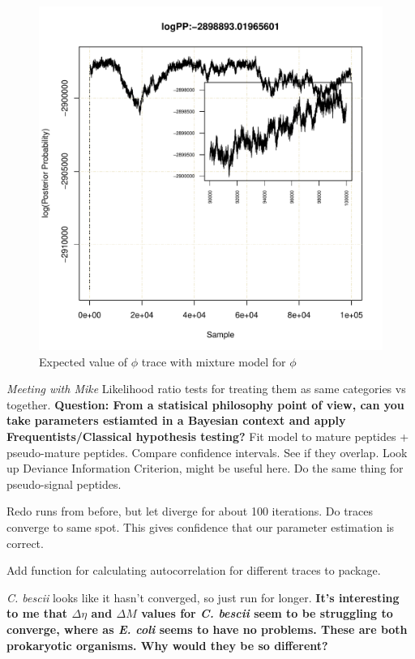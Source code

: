 \documentclass[11pt]{labbook}
\begin{document}
\begin{figure}[H]
\centering
\includegraphics[page=9,scale=0.6]{Mixture_model_testing/Test_mixture/real_data/Graphs/yeast_logPost_mixProb_phi_traces_updated.pdf}
\caption{Expected value of $\phi$ trace with mixture model for $\phi$}
\end{figure}


\textit{Meeting with Mike}
Likelihood ratio tests for treating them as same categories vs together. \textbf{Question: From a statisical philosophy point of view, can you take parameters estiamted in a Bayesian context and apply Frequentists/Classical hypothesis testing?} Fit model to mature peptides + pseudo-mature peptides. Compare confidence intervals. See if they overlap. Look up Deviance Information Criterion, might be useful here. Do the same thing for pseudo-signal peptides. 

Redo runs from before, but let diverge for about 100 iterations. Do traces converge to same spot. This gives confidence that our parameter estimation is correct.

Add function for calculating autocorrelation for different traces to package.

\textit{C. bescii} looks like it hasn't converged, so just run for longer. \textbf{It's interesting to me that $\Delta\eta$ and $\Delta\mathit{M}$ values for \textit{C. bescii} seem to be struggling to converge, where as \textit{E. coli} seems to have no problems. These are both prokaryotic organisms. Why would they be so different?} 
\end{document}
